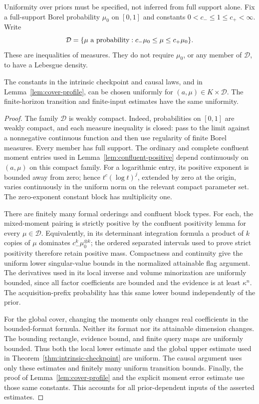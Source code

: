 Uniformity over priors must be specified, not inferred from full support
alone. Fix a full-support Borel probability $\mu_0$ on $[0,1]$ and
constants $0<c_-\le1\le c_+<\infty$. Write
\[
 \mathcal D=\{\mu\hbox{ a probability}:c_-\mu_0\le\mu\le c_+\mu_0\}.
\]
These are inequalities of measures. They do not require $\mu_0$, or
any member of $\mathcal D$, to have a Lebesgue density.

\begin{lemma}
\label{lem:prior-envelope}
The constants in the intrinsic checkpoint and causal laws, and in
Lemma~\ref{lem:cover-profile}, can be chosen uniformly for
$(a,\mu)\in K\times\mathcal D$. The finite-horizon transition and
finite-input estimates have the same uniformity.
\end{lemma}
\begin{proof}
The family $\mathcal D$ is weakly compact. Indeed, probabilities on
$[0,1]$ are weakly compact, and each measure inequality is closed:
pass to the limit against a nonnegative continuous function and then
use regularity of finite Borel measures. Every member has full support.
The ordinary and complete confluent moment entries used in
Lemma~\ref{lem:confluent-positive} depend continuously on
$(a,\mu)$ on this compact family. For a logarithmic entry, its positive
exponent is bounded away from zero; hence $t^c(\log t)^j$, extended
by zero at the origin, varies continuously in the uniform norm on
the relevant compact parameter set. The zero-exponent constant block
has multiplicity one.

There are finitely many formal orderings and confluent block types.
For each, the mixed-moment pairing is strictly positive by the
confluent positivity lemma for every $\mu\in\mathcal D$.
Equivalently, in its determinant integration formula a product of
$k$ copies of $\mu$ dominates $c_-^k\mu_0^{\otimes k}$; the ordered
separated intervals used to prove strict positivity therefore retain
positive mass. Compactness and continuity give the uniform lower
singular-value bounds in the normalized attainable flag argument.
The derivatives used in its local inverse and volume minorization
are uniformly bounded, since all factor coefficients are bounded and
the evidence is at least $\kappa^n$. The acquisition-prefix probability
has this same lower bound independently of the prior.

For the global cover, changing the moments only changes real
coefficients in the bounded-format formula. Neither its format nor
its attainable dimension changes. The bounding rectangle, evidence
bound, and finite query maps are uniformly bounded. Thus both the
local lower estimate and the global upper estimate used in
Theorem~\ref{thm:intrinsic-checkpoint} are uniform. The causal argument
uses only these estimates and finitely many uniform transition bounds.
Finally, the proof of Lemma~\ref{lem:cover-profile} and the explicit
moment error estimate use those same constants. This accounts for
all prior-dependent inputs of the asserted estimates.
\end{proof}

